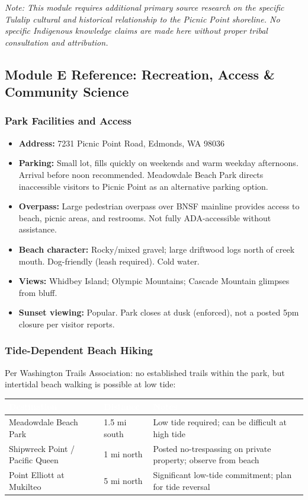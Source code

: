 \documentclass[11pt,letterpaper]{article}
\newcommand{\tableheader}[1]{\textbf{\sffamily\textcolor{white}{#1}}}
\begin{document}
\textit{Note: This module requires additional primary source research on the specific Tulalip cultural and historical relationship to the Picnic Point shoreline. No specific Indigenous knowledge claims are made here without proper tribal consultation and attribution.}

\subsection{Module E Reference: Recreation, Access \& Community Science}

\subsubsection{Park Facilities and Access}

\begin{itemize}
  \item \textbf{Address:} 7231 Picnic Point Road, Edmonds, WA 98036
  \item \textbf{Parking:} Small lot, fills quickly on weekends and warm weekday afternoons. Arrival before noon recommended. Meadowdale Beach Park directs inaccessible visitors to Picnic Point as an alternative parking option.
  \item \textbf{Overpass:} Large pedestrian overpass over BNSF mainline provides access to beach, picnic areas, and restrooms. Not fully ADA-accessible without assistance.
  \item \textbf{Beach character:} Rocky/mixed gravel; large driftwood logs north of creek mouth. Dog-friendly (leash required). Cold water.
  \item \textbf{Views:} Whidbey Island; Olympic Mountains; Cascade Mountain glimpses from bluff.
  \item \textbf{Sunset viewing:} Popular. Park closes at dusk (enforced), not a posted 5pm closure per visitor reports.
\end{itemize}

\subsubsection{Tide-Dependent Beach Hiking}

Per Washington Trails Association: no established trails within the park, but intertidal beach walking is possible at low tide:

\begin{center}
\begin{tabularx}{\textwidth}{L{4cm}L{2.5cm}X}
\toprule
{}
\tableheader{Destination} & \tableheader{Distance} & \tableheader{Notes} \\
\midrule
Meadowdale Beach Park & 1.5 mi south & Low tide required; can be difficult at high tide \\
Shipwreck Point / Pacific Queen & 1 mi north & Posted no-trespassing on private property; observe from beach \\
Point Elliott at Mukilteo & 5 mi north & Significant low-tide commitment; plan for tide reversal \\
\bottomrule
\end{tabularx}
\end{center}
\end{document}
